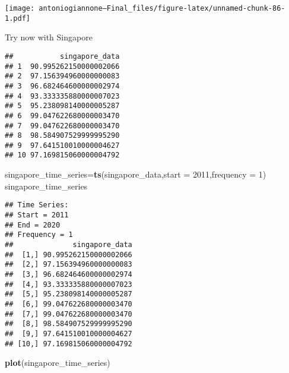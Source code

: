 \documentclass[
]{article}
\newenvironment{Shaded}{\begin{snugshade}}{\end{snugshade}}
\newcommand{\AttributeTok}[1]{\textcolor[rgb]{0.13,0.29,0.53}{#1}}
\newcommand{\DecValTok}[1]{\textcolor[rgb]{0.00,0.00,0.81}{#1}}
\newcommand{\FunctionTok}[1]{\textcolor[rgb]{0.13,0.29,0.53}{\textbf{#1}}}
\newcommand{\NormalTok}[1]{#1}
\newcommand{\OtherTok}[1]{\textcolor[rgb]{0.56,0.35,0.01}{#1}}
\newcommand{\SpecialCharTok}[1]{\textcolor[rgb]{0.81,0.36,0.00}{\textbf{#1}}}
\newcommand{\StringTok}[1]{\textcolor[rgb]{0.31,0.60,0.02}{#1}}
\begin{document}
\texttt{[image: antoniogiannone---Final\_files/figure-latex/unnamed-chunk-86-1.pdf]}

Try now with Singapore

\begin{Shaded}
\end{Shaded}

\begin{verbatim}
##           singapore_data
## 1  90.995262150000002066
## 2  97.156394960000000083
## 3  96.682464600000002974
## 4  93.333335880000007023
## 5  95.238098140000005287
## 6  99.047622680000003470
## 7  99.047622680000003470
## 8  98.584907529999995290
## 9  97.641510010000004627
## 10 97.169815060000004792
\end{verbatim}

\begin{Shaded}
\begin{Highlighting}[]
\NormalTok{singapore\_time\_series}\OtherTok{=}\FunctionTok{ts}\NormalTok{(singapore\_data,}\AttributeTok{start =} \DecValTok{2011}\NormalTok{,}\AttributeTok{frequency =} \DecValTok{1}\NormalTok{)}
\NormalTok{singapore\_time\_series}
\end{Highlighting}
\end{Shaded}

\begin{verbatim}
## Time Series:
## Start = 2011 
## End = 2020 
## Frequency = 1 
##              singapore_data
##  [1,] 90.995262150000002066
##  [2,] 97.156394960000000083
##  [3,] 96.682464600000002974
##  [4,] 93.333335880000007023
##  [5,] 95.238098140000005287
##  [6,] 99.047622680000003470
##  [7,] 99.047622680000003470
##  [8,] 98.584907529999995290
##  [9,] 97.641510010000004627
## [10,] 97.169815060000004792
\end{verbatim}

\begin{Shaded}
\begin{Highlighting}[]
\FunctionTok{plot}\NormalTok{(singapore\_time\_series)}
\end{Highlighting}
\end{Shaded}
\end{document}

